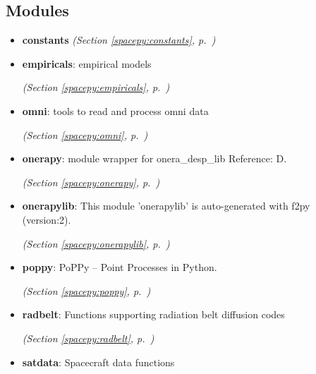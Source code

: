 
\subsection{Modules}

\begin{itemize}
\setlength{\parskip}{0ex}
\item \textbf{constants}
  \textit{(Section \ref{spacepy:constants}, p.~\pageref{spacepy:constants})}

\item \textbf{empiricals}: empirical models



  \textit{(Section \ref{spacepy:empiricals}, p.~\pageref{spacepy:empiricals})}

\item \textbf{omni}: tools to read and process omni data



  \textit{(Section \ref{spacepy:omni}, p.~\pageref{spacepy:omni})}

\item \textbf{onerapy}: module wrapper for onera\_desp\_lib Reference: D.



  \textit{(Section \ref{spacepy:onerapy}, p.~\pageref{spacepy:onerapy})}

\item \textbf{onerapylib}: This module 'onerapylib' is auto-generated with f2py (version:2).



  \textit{(Section \ref{spacepy:onerapylib}, p.~\pageref{spacepy:onerapylib})}

\item \textbf{poppy}: PoPPy -- Point Processes in Python.



  \textit{(Section \ref{spacepy:poppy}, p.~\pageref{spacepy:poppy})}

\item \textbf{radbelt}: Functions supporting radiation belt diffusion codes



  \textit{(Section \ref{spacepy:radbelt}, p.~\pageref{spacepy:radbelt})}

\item \textbf{satdata}: Spacecraft data functions




\end{itemize}

